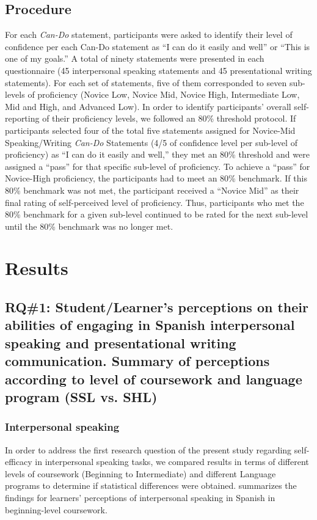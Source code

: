 \documentclass[output=paper]{langscibook}
\begin{document}
\subsection{Procedure}
For each \textit{Can-Do} statement, participants were asked to identify their level of confidence per each Can-Do statement as “I can do it easily and well” or “This is one of my goals.” A total of ninety statements were presented in each questionnaire (45 interpersonal speaking statements and 45 presentational writing statements). For each set of statements, five of them corresponded to seven sub-levels of proficiency (Novice Low, Novice Mid, Novice High, Intermediate Low, Mid and High, and Advanced Low). In order to identify participants’ overall self-reporting of their proficiency levels, we followed an 80\% threshold protocol. If participants selected four of the total five statements assigned for Novice-Mid Speaking/Writing \textit{Can-Do} Statements (4/5 of confidence level per sub-level of proficiency) as “I can do it easily and well,” they met an 80\% threshold and were assigned a “pass” for that specific sub-level of proficiency. To achieve a “pass” for Novice-High proficiency, the participants had to meet an 80\% benchmark. If this 80\% benchmark was not met, the participant received a “Novice Mid” as their final rating of self-perceived level of proficiency. Thus, participants who met the 80\% benchmark for a given sub-level continued to be rated for the next sub-level until the 80\% benchmark was no longer met.


\section{{Results}}

\subsection {RQ\#1: Student/Learner’s perceptions on their abilities of engaging in Spanish interpersonal speaking and presentational writing communication. Summary of perceptions according to level of coursework and language program (SSL vs. SHL)} %

\subsubsection{Interpersonal speaking} In order to address the first research question of the present study regarding self-efficacy in interpersonal speaking tasks, we compared results in terms of different levels of coursework (Beginning to Intermediate) and different Language programs to determine if statistical differences were obtained.  summarizes the findings for learners’ perceptions of interpersonal speaking in Spanish in beginning-level coursework.
\end{document}
